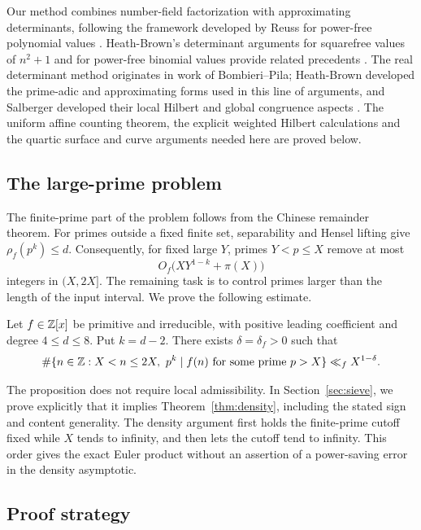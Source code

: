 Our method combines number-field factorization with approximating
determinants, following the framework developed by Reuss for
power-free polynomial values \cite[Sections~3--6]{Reuss2015PowerFree}.
Heath-Brown's determinant arguments for
squarefree values of $n^2+1$ and for power-free binomial values
provide related precedents
\cite{HeathBrown2012Squarefree,HeathBrown2013Powerfree}.
The real determinant method originates in work of Bombieri--Pila;
Heath-Brown developed the prime-adic and approximating forms used
in this line of arguments, and Salberger developed their local
Hilbert and global congruence aspects
\cite{BombieriPila1989,HeathBrown2002Density,HeathBrown2009Sums,
Salberger2007,Salberger2023}.
The uniform affine counting theorem, the explicit weighted Hilbert
calculations and the quartic surface and curve arguments needed here
are proved below.

\subsection{The large-prime problem}

The finite-prime part of the problem follows from the Chinese remainder
theorem. For primes outside a fixed finite set, separability and Hensel
lifting give $\rho_f(p^k)\le d$. Consequently, for fixed large $Y$, primes
$Y<p\le X$ remove at most
\[
 O_f\bigl(XY^{1-k}+\pi(X)\bigr)
\]
integers in $(X,2X]$. The remaining task is to control primes larger than
the length of the input interval. We prove the following estimate.

\begin{proposition}\label{prop:large-prime-tail}
Let $f\in\mathbb Z[x]$ be primitive and irreducible, with positive leading
coefficient and degree $4\le d\le8$. Put $k=d-2$. There exists
$\delta=\delta_f>0$ such that
\[
 \#\{n\in\mathbb Z:X<n\le2X,\ p^k\mid f(n)
          \text{ for some prime }p>X\}
 \ll_f X^{1-\delta}.
\]
\end{proposition}

The proposition does not require local admissibility. In
Section~\ref{sec:sieve}, we prove explicitly that it implies
Theorem~\ref{thm:density}, including the stated sign and content
generality. The density argument first holds the finite-prime cutoff
fixed while $X$ tends to infinity, and then lets the cutoff tend to
infinity. This order gives the exact Euler product without an assertion
of a power-saving error in the density asymptotic.

\subsection{Proof strategy}

